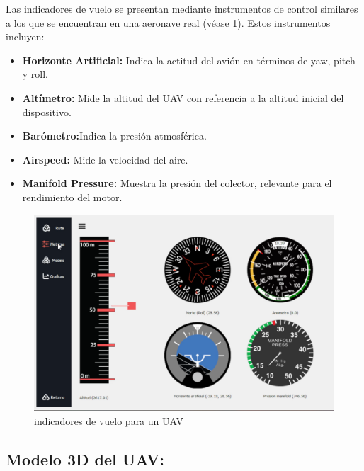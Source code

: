Las indicadores de vuelo se presentan mediante instrumentos de control similares a los que se encuentran en una aeronave real (véase \ref{fig:metricas interfaz }). Estos instrumentos incluyen:
\begin{itemize}
    \item \textbf{Horizonte Artificial:} Indica la actitud del avión en términos de yaw, pitch y roll.
\item \textbf{Altímetro:} Mide la altitud del UAV con referencia a la altitud inicial del dispositivo.
\item \textbf{Barómetro:}Indica la presión atmosférica.
\item \textbf{Airspeed: }Mide la velocidad del aire.
\item \textbf{Manifold Pressure:} Muestra la presión del colector, relevante para el rendimiento del motor.
\end{itemize}

\begin{figure}[H]
    \centering
    \includegraphics[width=6 in]{Imagenes/Interfaz/metricas.png}
    \caption{indicadores de vuelo para un UAV}
    \label{fig:metricas interfaz }
\end{figure}

\subsection{Modelo 3D del UAV:}


